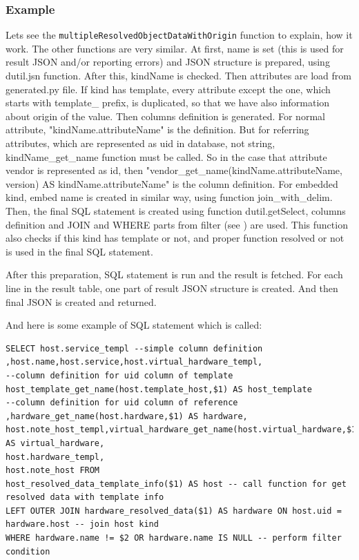 \documentclass[deska]{subfiles}
\begin{document}
\subsubsection{Example}
Lets see the {\tt multipleResolvedObjectDataWithOrigin} function to explain, how it work. The other functions are very similar.
At first, name is set (this is used for result JSON and/or reporting errors) and JSON structure is prepared,
using dutil.jsn function. After this, kindName is checked. Then attributes are load from generated.py file.
If kind has template, every attribute except the one, which starts with template\_ prefix, is duplicated, so that we have
also information about origin of the value.
Then columns definition is generated. For normal attribute, "kindName.attributeName" is the definition.
But for referring attributes, which are
represented as uid in database, not string, kindName\_get\_name function must be called. So in the case that attribute vendor is represented as id, then
"vendor\_get\_name(kindName.attributeName, version) AS kindName.attributeName" is the column definition. For embedded kind, embed name is created in similar way,
using function join\_with\_delim.
Then, the final SQL statement is created using function dutil.getSelect, columns definition and JOIN and WHERE parts from filter (see ) are used.
This function also checks if this kind has template or not, and proper function resolved or not is used in the final SQL statement.

After this preparation, SQL statement is run and the result is fetched. For each line in the result table, one part of result JSON structure is
created. And then final JSON is created and returned.

And here is some example of SQL statement which is called:
\begin{verbatim}
SELECT host.service_templ --simple column definition
,host.name,host.service,host.virtual_hardware_templ,
--column definition for uid column of template
host_template_get_name(host.template_host,$1) AS host_template
--column definition for uid column of reference
,hardware_get_name(host.hardware,$1) AS hardware,
host.note_host_templ,virtual_hardware_get_name(host.virtual_hardware,$1) AS virtual_hardware,
host.hardware_templ,
host.note_host FROM
host_resolved_data_template_info($1) AS host -- call function for get resolved data with template info
LEFT OUTER JOIN hardware_resolved_data($1) AS hardware ON host.uid = hardware.host -- join host kind
WHERE hardware.name != $2 OR hardware.name IS NULL -- perform filter condition
\end{verbatim}
\end{document}
